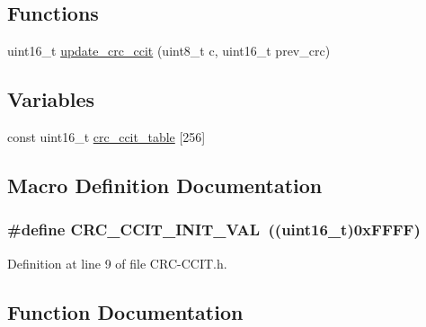 \subsection*{Functions}
\begin{DoxyCompactItemize}
\item 
uint16\+\_\+t \hyperlink{_c_r_c-_c_c_i_t_8h_a290cec53667d36f549f18f42d1539442}{update\+\_\+crc\+\_\+ccit} (uint8\+\_\+t c, uint16\+\_\+t prev\+\_\+crc)
\end{DoxyCompactItemize}
\subsection*{Variables}
\begin{DoxyCompactItemize}
\item 
const uint16\+\_\+t \hyperlink{_c_r_c-_c_c_i_t_8h_aada4617cdcf1f888402be21cb0e7215d}{crc\+\_\+ccit\+\_\+table} \mbox{[}256\mbox{]}
\end{DoxyCompactItemize}


\subsection{Macro Definition Documentation}
\subsubsection[{\texorpdfstring{C\+R\+C\+\_\+\+C\+C\+I\+T\+\_\+\+I\+N\+I\+T\+\_\+\+V\+AL}{CRC\_CCIT\_INIT\_VAL}}]{\setlength{\rightskip}{0pt plus 5cm}\#define C\+R\+C\+\_\+\+C\+C\+I\+T\+\_\+\+I\+N\+I\+T\+\_\+\+V\+AL~((uint16\+\_\+t)0x\+F\+F\+F\+F)}\hypertarget{_c_r_c-_c_c_i_t_8h_ae53bd48601e15e51c3d3c658afae6419}{}\label{_c_r_c-_c_c_i_t_8h_ae53bd48601e15e51c3d3c658afae6419}


Definition at line 9 of file C\+R\+C-\/\+C\+C\+I\+T.\+h.



\subsection{Function Documentation}
